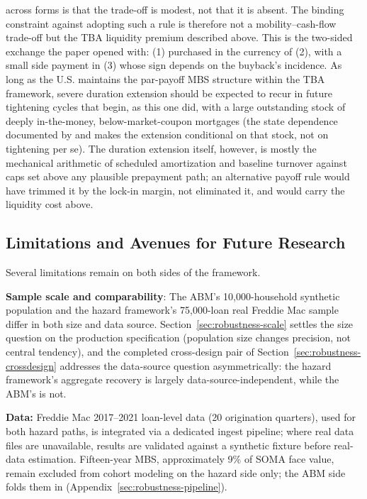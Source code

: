 \documentclass[12pt]{article}
\begin{document}
across forms is that the trade-off is modest, not that it is absent. The binding constraint against adopting such a rule is therefore not a mobility--cash-flow trade-off but the TBA liquidity premium described above. This is the two-sided exchange the paper opened with: (1) purchased in the currency of (2), with a small side payment in (3) whose sign depends on the buyback's incidence. As long as the U.S. maintains the par-payoff MBS structure within the TBA framework, severe duration extension should be expected to recur in future tightening cycles that begin, as this one did, with a large outstanding stock of deeply in-the-money, below-market-coupon mortgages (the state dependence documented by \citet{berger2021} and \citet{eichenbaum2022} makes the extension conditional on that stock, not on tightening per se). The duration extension itself, however, is mostly the mechanical arithmetic of scheduled amortization and baseline turnover against caps set above any plausible prepayment path; an alternative payoff rule would have trimmed it by the lock-in margin, not eliminated it, and would carry the liquidity cost above.

\subsection{Limitations and Avenues for Future Research}\label{sec:limitations}

Several limitations remain on both sides of the framework.

\textbf{Sample scale and comparability}: The ABM's 10,000-household synthetic population and the hazard framework's 75,000-loan real Freddie Mac sample differ in both size and data source. Section~\ref{sec:robustness-scale} settles the size question on the production specification (population size changes precision, not central tendency), and the completed cross-design pair of Section~\ref{sec:robustness-crossdesign} addresses the data-source question asymmetrically: the hazard framework's aggregate recovery is largely data-source-independent, while the ABM's is not.

\textbf{Data:} Freddie Mac 2017--2021 loan-level data (20 origination quarters), used for both hazard paths, is integrated via a dedicated ingest pipeline; where real data files are unavailable, results are validated against a synthetic fixture before real-data estimation. Fifteen-year MBS, approximately 9\% of SOMA face value, remain excluded from cohort modeling on the hazard side only; the ABM side folds them in (Appendix~\ref{sec:robustness-pipeline}).
\end{document}
